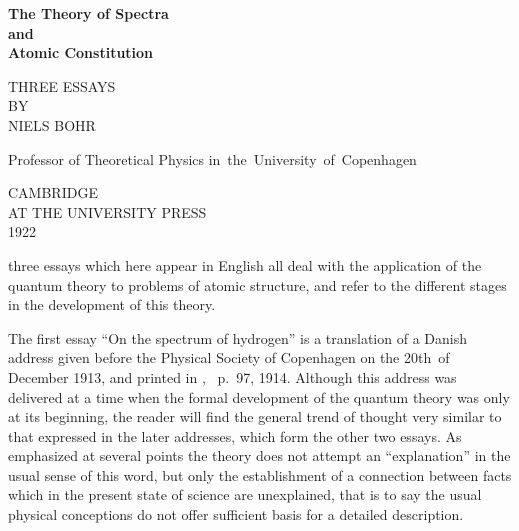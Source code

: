 {\small\raggedright
 \TransNoteText

 }

\newpage
\begin{center}
\Huge\bfseries
The Theory of Spectra \\
and \\
Atomic Constitution
\bigskip

\large\normalfont
THREE ESSAYS \\
BY \\
\Large
NIELS BOHR
\medskip

\normalsize
Professor of Theoretical Physics in~the~University~of~Copenhagen
\vfill

\Large
CAMBRIDGE \\
AT THE UNIVERSITY PRESS \\
1922
\end{center}
\newpage
{}

\FrontMatter

\Preface

 three essays which here appear in English all deal with
the application of the quantum theory to problems of atomic
structure, and refer to the different stages in the development of
this theory.

The first essay ``On the spectrum of hydrogen'' is a translation of
a Danish address given before the Physical Society of Copenhagen
on the 20th~of December 1913, and printed in ,
\ p.~97, 1914. Although this address was delivered at a time
when the formal development of the quantum theory was only at
its beginning, the reader will find the general trend of thought
very similar to that expressed in the later addresses, which
form the other two essays. As emphasized at several points the
theory does not attempt an ``explanation'' in the usual sense of
this word, but only the establishment of a connection between facts
which in the present state of science are unexplained, that is to
say the usual physical conceptions do not offer sufficient basis for
a detailed description.

